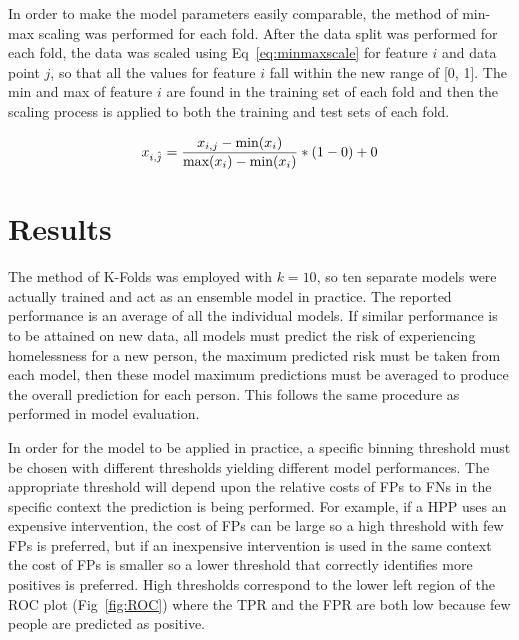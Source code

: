 \documentclass[10pt,letterpaper]{article}
\newcommand{\red}[1]{{\color{red}{#1}}}
\begin{document}
In order to make the model parameters easily comparable, the method of min-max scaling was performed for each fold. After the data split was performed for each fold, the data was scaled using Eq~\ref{eq:minmaxscale} for feature $i$ and data point $j$, so that all the values for feature $i$ fall within the new range of [0, 1]. The min and max of feature $i$ are found in the training set of each fold and then the scaling process is applied to both the training and test sets of each fold.

\begin{equation}
    \centering
    x_{i, \hat{j}} = \frac{x_{i, j} - \text{min}(x_{i})}{\text{max}(x_{i}) - \text{min}(x_{i})}
    * (1 - 0) + 0
    \label{eq:minmaxscale}
\end{equation}

\section*{Results}
The method of K-Folds was employed with $k=10$, so ten separate models were actually trained and act as an ensemble model in practice. The reported performance is an average of all the individual models. If similar performance is to be attained on new data, all models must predict the risk of experiencing homelessness for a new person, the maximum predicted risk must be taken from each model, then these model maximum predictions must be averaged to produce the overall prediction for each person. This follows the same procedure as performed in model evaluation.

In order for the model to be applied in practice, a specific binning threshold must be chosen with different thresholds yielding different model performances. The appropriate threshold will depend upon the relative costs of FPs to FNs in the specific context the prediction is being performed. For example, if a HPP uses an expensive intervention, the cost of FPs can be large so a high threshold with few FPs is preferred, but if an inexpensive intervention is used in the same context the cost of FPs is smaller so a lower threshold that correctly identifies more positives is preferred. High thresholds correspond to the lower left region of the ROC plot (Fig~\ref{fig:ROC}) where the TPR and the FPR are both low because few people are predicted as positive. \red{reduce or remove paragraph?}
\end{document}
